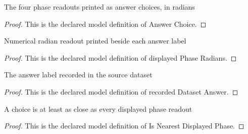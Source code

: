 \begin{definition}
  \label{def:physics:phyx-mini-0288:phyxminiproblems-problemphyxmini0288-answerchoice}
  The four phase readouts printed as answer choices, in radians
\end{definition}
\begin{proof}
  This is the declared model definition of Answer Choice.
\end{proof}
\begin{definition}
  \label{def:physics:phyx-mini-0288:phyxminiproblems-problemphyxmini0288-displayedphaseradians}
  Numerical radian readout printed beside each answer label
\end{definition}
\begin{proof}
  This is the declared model definition of displayed Phase Radians.
\end{proof}
\begin{definition}
  \label{def:physics:phyx-mini-0288:phyxminiproblems-problemphyxmini0288-recordeddatasetanswer}
  The answer label recorded in the source dataset
\end{definition}
\begin{proof}
  This is the declared model definition of recorded Dataset Answer.
\end{proof}
\begin{definition}
  \label{def:physics:phyx-mini-0288:phyxminiproblems-problemphyxmini0288-isnearestdisplayedphase}
  A choice is at least as close as every displayed phase readout
\end{definition}
\begin{proof}
  This is the declared model definition of Is Nearest Displayed Phase.
\end{proof}
